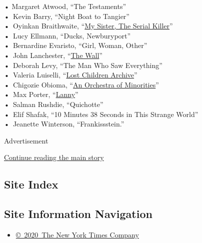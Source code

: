 • Margaret Atwood, ``The Testaments''\\
•~Kevin Barry, ``Night Boat to Tangier''\\
•~Oyinkan Braithwaite,
``\href{https://www.nytimes.com/2019/01/09/books/review/oyinkan-braithwaite-my-sister-the-serial-killer.html?searchResultPosition=2}{My
Sister, The Serial Killer}''\\
•~Lucy Ellmann, ``Ducks, Newburyport''\\
•~Bernardine Evaristo, ``Girl, Woman, Other''\\
•~John Lanchester,
``\href{https://www.nytimes.com/2019/03/05/books/review/john-lanchester-wall.html}{The
Wall}''\\
•~Deborah Levy, ``The Man Who Saw Everything''\\
•~Valeria Luiselli,
``\href{https://www.nytimes.com/2019/03/06/books/review/lost-children-archive-valeria-luiselli.html}{Lost
Children Archive}''\\
•~Chigozie Obioma,
``\href{https://www.nytimes.com/2019/01/21/books/review/chigozie-obioma-orchestra-minorities.html}{An
Orchestra of Minorities}''\\
•~Max Porter,
``\href{https://www.nytimes.com/2019/06/25/books/review/max-porter-lanny.html}{Lanny}''\\
•~Salman Rushdie, ``Quichotte''\\
•~Elif Shafak, ``10 Minutes 38 Seconds in This Strange World''\\
•~Jeanette Winterson, ``Frankissstein.''

Advertisement

\protect\hyperlink{after-bottom}{Continue reading the main story}

\hypertarget{site-index}{%
\subsection{Site Index}\label{site-index}}

\hypertarget{site-information-navigation}{%
\subsection{Site Information
Navigation}\label{site-information-navigation}}

\begin{itemize}
\tightlist
\item
  \href{https://help.nytimes.com/hc/en-us/articles/115014792127-Copyright-notice}{©~2020~The
  New York Times Company}
\end{itemize}

